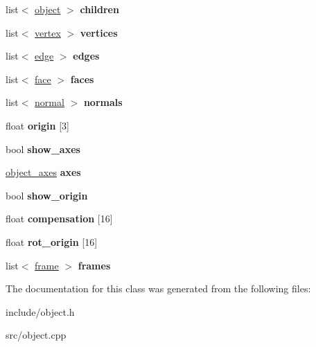 \begin{DoxyCompactItemize}
\mbox{\label{classobject_a1a313581b8358481d9c42bff8b7f6c42}} 
list$<$ \hyperlink{classobject}{object} $>$ {\bfseries children}
\item 
\mbox{\label{classobject_a7278bfffc4704696520683bfb395da44}} 
list$<$ \hyperlink{classvertex}{vertex} $>$ {\bfseries vertices}
\item 
\mbox{\label{classobject_abc60cb2c258fcbda52a3b837cf9e3abf}} 
list$<$ \hyperlink{classedge}{edge} $>$ {\bfseries edges}
\item 
\mbox{\label{classobject_a957ee3e1d2491444a7879ed81c10eca2}} 
list$<$ \hyperlink{classface}{face} $>$ {\bfseries faces}
\item 
\mbox{\label{classobject_a5ee08f3f3b0ec7b3a1406226ac4a472b}} 
list$<$ \hyperlink{classnormal}{normal} $>$ {\bfseries normals}
\item 
\mbox{\label{classobject_a1c5324d2586aca3c0fd280ac075eb306}} 
float {\bfseries origin} \mbox{[}3\mbox{]}
\item 
\mbox{\label{classobject_a37f599665f13088b41ef2638d6ba164f}} 
bool {\bfseries show\+\_\+axes}
\item 
\mbox{\label{classobject_a54652d62b451828b36c87194986b5943}} 
\hyperlink{structobject__axes}{object\+\_\+axes} {\bfseries axes}
\item 
\mbox{\label{classobject_a18d91cc7a213dd0578e44b2984e5ec90}} 
bool {\bfseries show\+\_\+origin}
\item 
\mbox{\label{classobject_a19883eb1b024497eb465b3708e813f60}} 
float {\bfseries compensation} \mbox{[}16\mbox{]}
\item 
\mbox{\label{classobject_a21d0a6ebc2f0040aed7e3596e5b2f72e}} 
float {\bfseries rot\+\_\+origin} \mbox{[}16\mbox{]}
\item 
\mbox{\label{classobject_ae50c6097bb51f8105dec67e5164d642e}} 
list$<$ \hyperlink{classframe}{frame} $>$ {\bfseries frames}
\end{DoxyCompactItemize}


The documentation for this class was generated from the following files\+:\begin{DoxyCompactItemize}
\item 
include/object.\+h\item 
src/object.\+cpp\end{DoxyCompactItemize}
